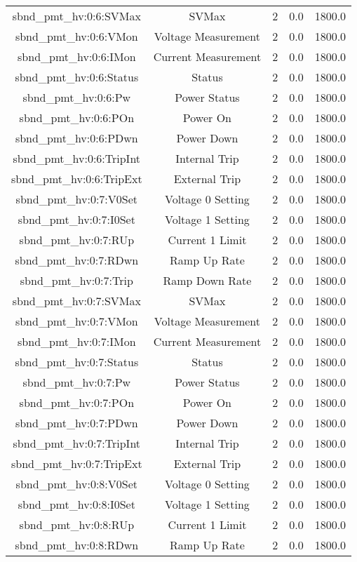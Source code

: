 \begin{table}[ptb]
\begin{tabular}{c | c c c c}
sbnd_pmt_hv:0:6:SVMax & SVMax & 2 & 0.0 & 1800.0\\ 
sbnd_pmt_hv:0:6:VMon & Voltage Measurement & 2 & 0.0 & 1800.0\\ 
sbnd_pmt_hv:0:6:IMon & Current Measurement & 2 & 0.0 & 1800.0\\ 
sbnd_pmt_hv:0:6:Status & Status & 2 & 0.0 & 1800.0\\ 
sbnd_pmt_hv:0:6:Pw & Power Status & 2 & 0.0 & 1800.0\\ 
sbnd_pmt_hv:0:6:POn & Power On & 2 & 0.0 & 1800.0\\ 
sbnd_pmt_hv:0:6:PDwn & Power Down & 2 & 0.0 & 1800.0\\ 
sbnd_pmt_hv:0:6:TripInt & Internal Trip & 2 & 0.0 & 1800.0\\ 
sbnd_pmt_hv:0:6:TripExt & External Trip & 2 & 0.0 & 1800.0\\ 
sbnd_pmt_hv:0:7:V0Set & Voltage 0 Setting & 2 & 0.0 & 1800.0\\ 
sbnd_pmt_hv:0:7:I0Set & Voltage 1 Setting & 2 & 0.0 & 1800.0\\ 
sbnd_pmt_hv:0:7:RUp & Current 1 Limit & 2 & 0.0 & 1800.0\\ 
sbnd_pmt_hv:0:7:RDwn & Ramp Up Rate & 2 & 0.0 & 1800.0\\ 
sbnd_pmt_hv:0:7:Trip & Ramp Down Rate & 2 & 0.0 & 1800.0\\ 
sbnd_pmt_hv:0:7:SVMax & SVMax & 2 & 0.0 & 1800.0\\ 
sbnd_pmt_hv:0:7:VMon & Voltage Measurement & 2 & 0.0 & 1800.0\\ 
sbnd_pmt_hv:0:7:IMon & Current Measurement & 2 & 0.0 & 1800.0\\ 
sbnd_pmt_hv:0:7:Status & Status & 2 & 0.0 & 1800.0\\ 
sbnd_pmt_hv:0:7:Pw & Power Status & 2 & 0.0 & 1800.0\\ 
sbnd_pmt_hv:0:7:POn & Power On & 2 & 0.0 & 1800.0\\ 
sbnd_pmt_hv:0:7:PDwn & Power Down & 2 & 0.0 & 1800.0\\ 
sbnd_pmt_hv:0:7:TripInt & Internal Trip & 2 & 0.0 & 1800.0\\ 
sbnd_pmt_hv:0:7:TripExt & External Trip & 2 & 0.0 & 1800.0\\ 
sbnd_pmt_hv:0:8:V0Set & Voltage 0 Setting & 2 & 0.0 & 1800.0\\ 
sbnd_pmt_hv:0:8:I0Set & Voltage 1 Setting & 2 & 0.0 & 1800.0\\ 
sbnd_pmt_hv:0:8:RUp & Current 1 Limit & 2 & 0.0 & 1800.0\\ 
sbnd_pmt_hv:0:8:RDwn & Ramp Up Rate & 2 & 0.0 & 1800.0\\ 

\end{tabular}
\end{table}
